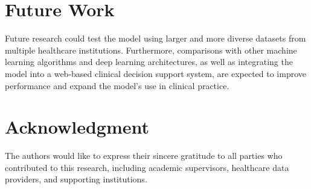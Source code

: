 \documentclass[conference]{IEEEtran}
\begin{document}
\section{Future Work}

Future research could test the model using larger and more diverse datasets from multiple healthcare institutions. Furthermore, comparisons with other machine learning algorithms and deep learning architectures, as well as integrating the model into a web-based clinical decision support system, are expected to improve performance and expand the model's use in clinical practice.

\section*{Acknowledgment}

The authors would like to express their sincere gratitude to all parties who contributed to this research, including academic supervisors, healthcare data providers, and supporting institutions.



\end{document}
